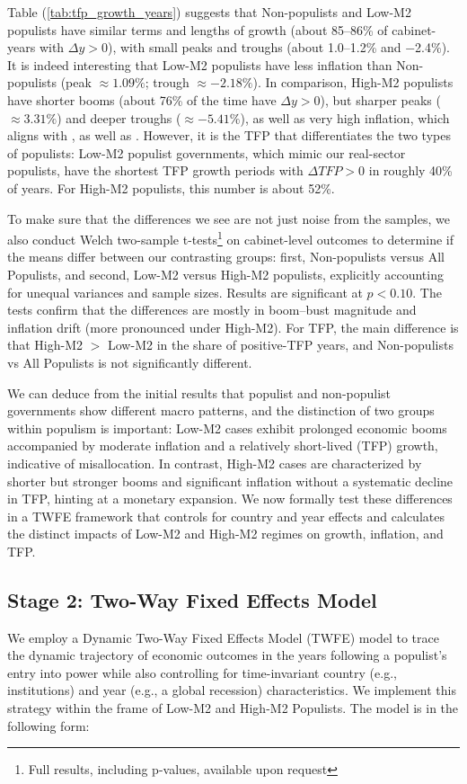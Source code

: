 \documentclass{OUP-EJ}
\begin{document}
Table (\ref{tab:tfp_growth_years}) suggests that Non-populists and Low-M2 populists have similar terms and lengths of growth (about 85–86\% of cabinet-years with $\Delta y > 0$), with small peaks and troughs (about 1.0–1.2\% and −2.4\%). It is indeed interesting that Low-M2 populists have less inflation than Non-populists (peak $\approx 1.09\%$; trough $\approx −2.18\%$). In comparison, High-M2 populists have shorter booms (about 76\% of the time have $\Delta y > 0$), but sharper peaks ($\approx 3.31\%$) and deeper troughs ($\approx −5.41\%$), as well as very high inflation, which aligns with \cite{DornbuschEdwards1990} , as well as \cite{BallFreytag2019}. However, it is the TFP that differentiates the two types of populists: Low-M2 populist governments, which mimic our real-sector populists, have the shortest TFP growth periods with $\Delta TFP > 0$ in roughly 40\% of years. For High-M2 populists, this number is about 52\%. 

To make sure that the differences we see are not just noise from the samples, we also conduct Welch two-sample t-tests\footnote{Full results, including p-values, available upon request}  on cabinet-level outcomes to determine if the means differ between our contrasting groups: first, Non-populists versus All Populists, and second, Low-M2 versus High-M2 populists, explicitly accounting for unequal variances and sample sizes. Results are significant at $p < 0.10$. The tests confirm that the differences are mostly in boom–bust magnitude and inflation drift (more pronounced under High-M2). For TFP, the main difference is that High-M2 $>$ Low-M2 in the share of positive-TFP years, and Non-populists vs All Populists is not significantly different.

We can deduce from the initial results that populist and non-populist governments show different macro patterns, and the distinction of two groups within populism is important: Low-M2 cases exhibit prolonged economic booms accompanied by moderate inflation and a relatively short-lived (TFP) growth, indicative of misallocation. In contrast, High-M2 cases are characterized by shorter but stronger booms and significant inflation without a systematic decline in TFP, hinting at a monetary expansion. We now formally test these differences in a TWFE framework that controls for country and year effects and calculates the distinct impacts of Low-M2 and High-M2 regimes on growth, inflation, and TFP.

\subsection{Stage 2: Two-Way Fixed Effects Model}
We employ a Dynamic Two-Way Fixed Effects Model (TWFE) model to trace the dynamic trajectory of economic outcomes in the years following a populist’s entry into power while also controlling for time-invariant country (e.g., institutions) and year (e.g., a global recession) characteristics. We implement this strategy within the frame of Low-M2 and High-M2 Populists. The model is in the following form:
\end{document}
